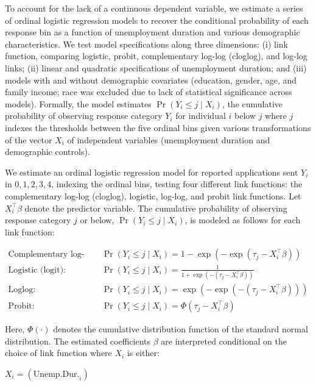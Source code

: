 \documentclass[
]{article}
\begin{document}
To account for the lack of a continuous dependent variable, we estimate
a series of ordinal logistic regression models to recover the
conditional probability of each response bin as a function of
unemployment duration and various demographic characteristics. We test
model specifications along three dimensions: (i) link function,
comparing logistic, probit, complementary log-log (cloglog), and log-log
links; (ii) linear and quadratic specifications of unemployment
duration; and (iii) models with and without demographic covariates
(education, gender, age, and family income; race was excluded due to
lack of statistical significance across models). Formally, the model
estimates \(\Pr(Y_i \leq j \mid X_i)\), the cumulative probability of
observing response category \(Y_i\) for individual \(i\) below \(j\)
where \(j\) indexes the thresholds between the five ordinal bins given
various transformations of the vector \(X_i\) of independent variables
(unemployment duration and demographic controls).

We estimate an ordinal logistic regression model for reported
applications sent \(Y_i\) in \({0, 1, 2, 3, 4}\), indexing the ordinal
bins, testing four different link functions: the complementary log-log
(cloglog), logistic, log-log, and probit link functions. Let
\(X_i^\top \beta\) denote the predictor variable. The cumulative
probability of observing response category \(j\) or below,
\(\Pr(Y_i \leq j \mid X_i)\), is modeled as follows for each link
function:

\begin{align*}
\text{Complementary log-log (cloglog):} \quad & \Pr(Y_i \leq j \mid X_i) = 1 - \exp\left( -\exp\left( \tau_j - X_i^\top \beta \right) \right) \\
\text{Logistic (logit):} \quad & \Pr(Y_i \leq j \mid X_i) = \frac{1}{1 + \exp\left( -(\tau_j - X_i^\top \beta) \right)} \\
\text{Loglog:} \quad & \Pr(Y_i \leq j \mid X_i) = \exp\left( -\exp\left( -(\tau_j - X_i^\top \beta) \right) \right) \\
\text{Probit:} \quad & \Pr(Y_i \leq j \mid X_i) = \Phi(\tau_j - X_i^\top \beta)
\end{align*}

Here, \(\Phi(\cdot)\) denotes the cumulative distribution function of
the standard normal distribution. The estimated coefficients \(\beta\)
are interpreted conditional on the choice of link function where \(X_i\)
is either:

\(X_i = \left( \text{Unemp.Dur.}_i \right)\)
\end{document}
